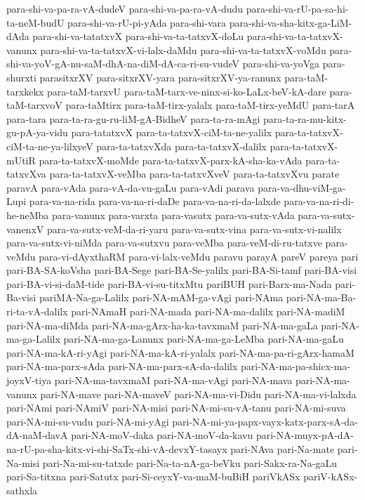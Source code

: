 {para-shi-va-pa-ra-vA-dudeV
para-shi-va-pa-ra-vA-dudu
para-shi-va-rU-pa-sa-hi-ta-neM-budU
para-shi-va-rU-pi-yAda
para-shi-vara
para-shi-va-sha-kitx-ga-LiM-dAda
para-shi-va-tatatxvX
para-shi-va-ta-tatxvX-doLu
para-shi-va-ta-tatxvX-vanunx
para-shi-va-ta-tatxvX-vi-lalx-daMdu
para-shi-va-ta-tatxvX-voMdu
para-shi-va-yoV-gA-nu-saM-dhA-na-diM-dA-ca-ri-su-vudeV
para-shi-va-yoVga
para-shurxti
parasitxrXV
para-sitxrXV-yara
para-sitxrXV-ya-ranunx
para-taM-tarxkekx
para-taM-tarxvU
para-taM-tarx-ve-ninx-si-ko-LaLx-beV-kA-dare
para-taM-tarxvoV
para-taMtirx
para-taM-tirx-yalalx
para-taM-tirx-yeMdU
para-tarA
para-tara
para-ta-ra-gu-ru-liM-gA-BidheV
para-ta-ra-mAgi
para-ta-ra-mu-kitx-gu-pA-ya-vidu
para-tatatxvX
para-ta-tatxvX-ciM-ta-ne-yalilx
para-ta-tatxvX-ciM-ta-ne-ya-lilxyeV
para-ta-tatxvXda
para-ta-tatxvX-dalilx
para-ta-tatxvX-mUtiR
para-ta-tatxvX-moMde
para-ta-tatxvX-parx-kA-sha-ka-vAda
para-ta-tatxvXva
para-ta-tatxvX-veMba
para-ta-tatxvXveV
para-ta-tatxvXvu
parate
paravA
para-vAda
para-vA-da-vu-gaLu
para-vAdi
parava
para-va-dhu-viM-ga-Lupi
para-va-na-rida
para-va-na-ri-daDe
para-va-na-ri-da-lalxde
para-va-na-ri-di-he-neMba
para-vanunx
para-varxta
para-vasutx
para-va-sutx-vAda
para-va-sutx-vanenxV
para-va-sutx-veM-da-ri-yaru
para-va-sutx-vina
para-va-sutx-vi-nalilx
para-va-sutx-vi-niMda
para-va-sutxvu
para-veMba
para-veM-di-ru-tatxve
para-veMdu
para-vi-dAyxthaRM
para-vi-lalx-veMdu
paravu
parayA
pareV
pareya
pari
pari-BA-SA-koVsha
pari-BA-Sege
pari-BA-Se-yalilx
pari-BA-Si-tamf
pari-BA-visi
pari-BA-vi-si-daM-tide
pari-BA-vi-su-titxMtu
pariBUH
pari-Barx-ma-Nada
pari-Ba-visi
pariMA-Na-ga-Lalilx
pari-NA-mAM-ga-vAgi
pari-NAma
pari-NA-ma-Ba-ri-ta-vA-dalilx
pari-NAmaH
pari-NA-mada
pari-NA-ma-dalilx
pari-NA-madiM
pari-NA-ma-diMda
pari-NA-ma-gArx-ha-ka-tavxmaM
pari-NA-ma-gaLa
pari-NA-ma-ga-Lalilx
pari-NA-ma-ga-Lanunx
pari-NA-ma-ga-LeMba
pari-NA-ma-gaLu
pari-NA-ma-kA-ri-yAgi
pari-NA-ma-kA-ri-yalalx
pari-NA-ma-pa-ri-gArx-hamaM
pari-NA-ma-parx-sAda
pari-NA-ma-parx-sA-da-dalilx
pari-NA-ma-pa-shicx-ma-joyxV-tiya
pari-NA-ma-tavxmaM
pari-NA-ma-vAgi
pari-NA-mava
pari-NA-ma-vanunx
pari-NA-mave
pari-NA-maveV
pari-NA-ma-vi-Didu
pari-NA-ma-vi-lalxda
pari-NAmi
pari-NAmiV
pari-NA-misi
pari-NA-mi-su-vA-tanu
pari-NA-mi-suva
pari-NA-mi-su-vudu
pari-NA-mi-yAgi
pari-NA-mi-ya-papx-vayx-katx-parx-sA-da-dA-naM-davA
pari-NA-moV-daka
pari-NA-moV-da-kavu
pari-NA-muyx-pA-dA-na-rU-pa-sha-kitx-vi-shi-SaTx-shi-vA-devxY-tasayx
pari-NAva
pari-Na-mate
pari-Na-misi
pari-Na-mi-su-tatxde
pari-Na-ta-nA-ga-beVku
pari-Sakx-ra-Na-gaLu
pari-Sa-titxna
pari-Satutx
pari-Si-ceyxY-va-maM-buBiH
pariVkASx
pariV-kASx-sathxla
}
